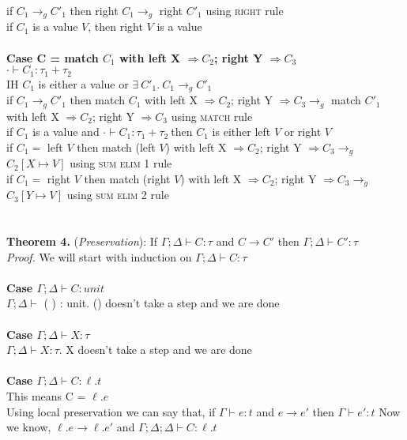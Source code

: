 \documentclass{article}
\begin{document}
if $C_1 \to_g C'_1$ then right $C_1 \to_g$ right $C'_1$ using \textsc{right} rule\\
if $C_1$ is a value $V$, then right $V$ is a value\\ \\
\textbf{Case C = match $C_1$ with left X $\Rightarrow C_2$; right Y $\Rightarrow C_3$}\\
$\cdot \vdash C_1: \tau_1 + \tau_2$\\
IH $C_1$ is either a value or $  \exists \ C'_1.\ C_1 \to_g C'_1 $ \\
if $C_1 \to_g C'_1$ then match $C_1$ with left X $\Rightarrow C_2$; right Y $\Rightarrow C_3 \to_g$ match $C'_1$ with left X $\Rightarrow C_2$; right Y $\Rightarrow C_3$ using \textsc{match} rule\\
if $C_1$ is a value and $\cdot \vdash C_1: \tau_1 + \tau_2\ $then $C_1$ is either left $V$ or right $V$\\
if $C_1 = $ left $V$ then match (left $V$) with left X $\Rightarrow C_2$; right Y $\Rightarrow C_3 \to_g$ $C_2[X \mapsto V]$ using \textsc{sum elim 1} rule\\
if $C_1 = $ right $V$ then match (right $V$) with left X $\Rightarrow C_2$; right Y $\Rightarrow C_3 \to_g$ $C_3[Y \mapsto V]$ using \textsc{sum elim 2} rule\\
\\
\\
\textbf{Theorem 4.} (\textit{Preservation}): If $\Gamma;\Delta \vdash C : \tau$ and  $C \to C'$ then $\Gamma;\Delta \vdash C' : \tau$
  \\
\textit{Proof.} We will start with induction on $\Gamma;\Delta \vdash C : \tau$ \\ \\
\textbf{Case $\Gamma; \Delta \vdash C : unit$} \\
 $\Gamma; \Delta \vdash $ ( ) : unit. () doesn't take a step and we are done \\ \\
\textbf{Case $\Gamma; \Delta \vdash X : \tau$}       \\ 
$\Gamma; \Delta \vdash X : \tau$. X doesn't take a step and we are done \\ \\
\textbf{Case $\Gamma; \Delta \vdash C : \ell.t$}       \\ 
This means C = $\ell.e$ \\
Using local preservation we can say that, if $\Gamma \vdash e : t$ and  $e \to e'$ then $\Gamma \vdash e' : t$
Now we know, $\ell.e \to \ell.e'$ and $\Gamma; \Delta; \Delta \vdash C : \ell.t$  \\
\end{document}
